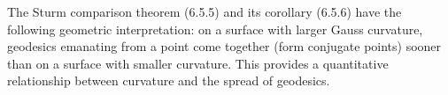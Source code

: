 The Sturm comparison theorem (6.5.5) and its corollary (6.5.6) have the following geometric interpretation: on a surface with larger Gauss curvature, geodesics emanating from a point come together (form conjugate points) sooner than on a surface with smaller curvature. This provides a quantitative relationship between curvature and the spread of geodesics.